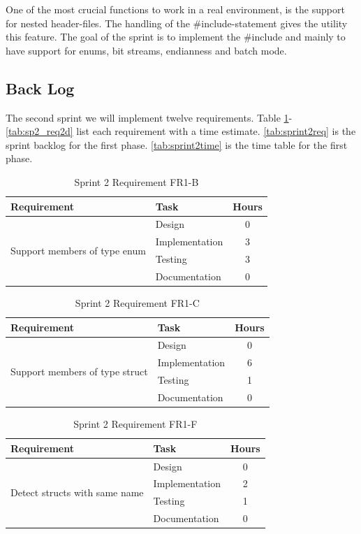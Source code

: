 One of the most crucial functions to work in a real environment, is the support for nested header-files. The handling of the \#include-statement gives the utility this feature. The goal of the sprint is to implement the \#include and mainly to have support for enums, bit streams, endianness and batch mode. 


\subsection{Back Log}
The second sprint we will implement twelve requirements. Table
\ref{tab:sp2_req1b}-\ref{tab:sp2_req2d}  list each requirement with a time
estimate. \autoref{tab:sprint2req} is the sprint backlog for the first phase.
\autoref{tab:sprint2time} is the time table for the first phase.

\begin{table}[!ht] \small \center
\caption{Sprint 2 Requirement FR1-B\label{tab:sp2_req1b}}
\begin{tabular}{l l c}
	\toprule
	Requirement & Task & Hours \\
	\midrule
	\multirow{4}{5cm}{ Support members of type enum} & Design & 0 \\
	& Implementation & 3 \\
	& Testing & 3 \\
	& Documentation & 0 \\
	\bottomrule
\end{tabular}
\end{table}

\begin{table}[!ht] \small \center
\caption{Sprint 2 Requirement FR1-C\label{tab:sp2_req1c}}
\begin{tabular}{l l c}
	\toprule
	Requirement & Task & Hours \\
	\midrule
	\multirow{4}{5cm}{Support members of type struct} & Design & 0 \\
	& Implementation & 6 \\
	& Testing & 1 \\
	& Documentation & 0 \\
	\bottomrule
\end{tabular}
\end{table}

\begin{table}[!ht] \small \center
\caption{Sprint 2 Requirement FR1-F\label{tab:sp2_req1f}}
\begin{tabular}{l l c}
	\toprule
	Requirement & Task & Hours \\
	\midrule
	\multirow{4}{5cm}{Detect structs with same name} & Design & 0 \\
	& Implementation & 2 \\
	& Testing & 1 \\
	& Documentation & 0 \\
	\bottomrule
\end{tabular}
\end{table}

